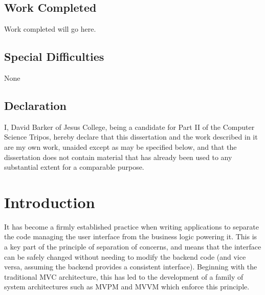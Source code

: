 \documentclass[12pt,twoside,notitlepage]{report}
\begin{document}
\section*{Work Completed}

Work completed will go here.

\section*{Special Difficulties}

None
 
\newpage
\section*{Declaration}

I, David Barker of Jesus College, being a candidate for Part II of
the Computer Science Tripos, hereby declare that this dissertation
and the work described in it are my own work, unaided except as may
be specified below, and that the dissertation does not contain
material that has already been used to any substantial extent for a
comparable purpose.

\bigskip
{}

\medskip
{}

\cleardoublepage

\tableofcontents

\listoffigures

\newpage



\cleardoublepage

\setcounter{page}{1}
\pagestyle{headings}



\chapter{Introduction}

It has become a firmly established practice when writing applications to separate the code managing the user interface from the business logic powering it. This is a key part of the principle of separation of concerns, and means that the interface can be safely changed without needing to modify the backend code (and vice versa, assuming the backend provides a consistent interface). Beginning with the traditional MVC architecture, this has led to the development of a family of system architectures such as MVPM and MVVM which enforce this principle.
\end{document}
